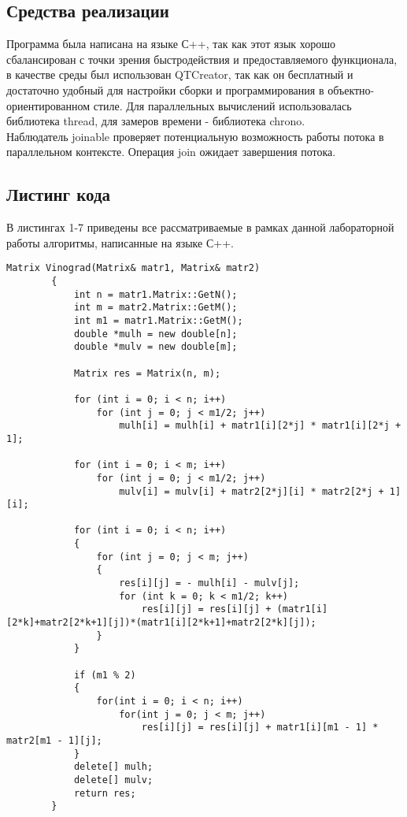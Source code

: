 \documentclass[a4paper, 14pt]{article}
\begin{document}
		\subsection{Средства реализации}
		Программа была написана на языке С++\cite{c++}, так как этот язык хорошо сбалансирован с точки зрения быстродействия и предоставляемого функционала, в качестве среды был использован QTCreator\cite{qtc}, так как он бесплатный и достаточно удобный для настройки сборки и программирования в объектно-ориентированном стиле. Для параллельных вычислений использовалась библиотека thread\cite{thread}, для замеров времени - библиотека chrono\cite{chrono}.\\

Наблюдатель joinable проверяет потенциальную возможность работы потока в параллельном контексте.
Операция join ожидает завершения потока\cite{multik}.\\
        \subsection{Листинг кода}
        В листингах 1-7 приведены все рассматриваемые в рамках данной лабораторной работы алгоритмы, написанные на языке С++.
        \newpage
		\begin{lstlisting}[label=some-code,caption=Алгоритм Винограда]
		Matrix Vinograd(Matrix& matr1, Matrix& matr2)
		{
			int n = matr1.Matrix::GetN();
			int m = matr2.Matrix::GetM();
			int m1 = matr1.Matrix::GetM();
			double *mulh = new double[n];
			double *mulv = new double[m];

			Matrix res = Matrix(n, m);

			for (int i = 0; i < n; i++)
				for (int j = 0; j < m1/2; j++)
					mulh[i] = mulh[i] + matr1[i][2*j] * matr1[i][2*j + 1];

			for (int i = 0; i < m; i++)
				for (int j = 0; j < m1/2; j++)
					mulv[i] = mulv[i] + matr2[2*j][i] * matr2[2*j + 1][i];

			for (int i = 0; i < n; i++)
			{
				for (int j = 0; j < m; j++)
				{
					res[i][j] = - mulh[i] - mulv[j];
					for (int k = 0; k < m1/2; k++)
						res[i][j] = res[i][j] + (matr1[i][2*k]+matr2[2*k+1][j])*(matr1[i][2*k+1]+matr2[2*k][j]);
				}
			}

			if (m1 % 2)
			{
				for(int i = 0; i < n; i++)
					for(int j = 0; j < m; j++)
						res[i][j] = res[i][j] + matr1[i][m1 - 1] * matr2[m1 - 1][j];
			}
			delete[] mulh;
			delete[] mulv;
			return res;
		}
		\end{lstlisting}
		
\end{document}
